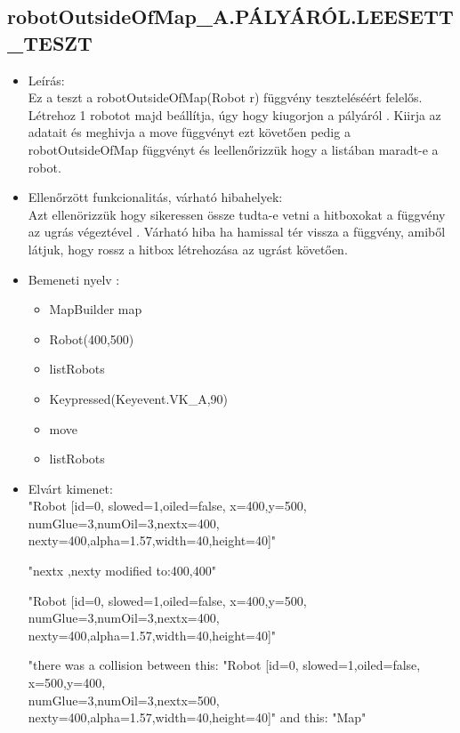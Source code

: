 \subsection{robotOutsideOfMap\_A.PÁLYÁRÓL.LEESETT\_TESZT}
\begin{itemize}
	\item Leírás: \\Ez a teszt a robotOutsideOfMap(Robot r) függvény teszteléséért felelős.
			Létrehoz 1 robotot majd beállítja, úgy hogy kiugorjon a pályáról .
			Kiirja az adatait  és meghivja a move függvényt ezt követően pedig a robotOutsideOfMap függvényt és leellenőrizzük hogy a listában maradt-e a robot.	\newline
	\item Ellenőrzött funkcionalitás, várható hibahelyek:\\
	Azt ellenörizzük hogy sikeressen össze tudta-e vetni a hitboxokat a függvény az ugrás végeztével .
	Várható hiba ha hamissal tér vissza a függvény, amiből látjuk, hogy rossz a hitbox létrehozása  az ugrást követően.
	\item Bemeneti nyelv :
		\begin{itemize}
\item MapBuilder map
		\item Robot(400,500)
		\item listRobots
		\item Keypressed(Keyevent.VK\_A,90)
		\item move
		\item listRobots
		\end{itemize}

	\item Elvárt kimenet: \\
		"Robot [id=0,  slowed=1,oiled=false, x=400,y=500, 
		\\numGlue=3,numOil=3,nextx=400,
		\\nexty=400,alpha=1.57,width=40,height=40]"\newline
		
		"nextx ,nexty modified to:400,400"\newline
	
		"Robot [id=0,  slowed=1,oiled=false, x=400,y=500, 
		\\numGlue=3,numOil=3,nextx=400,
		\\nexty=400,alpha=1.57,width=40,height=40]"\newline
		 
		 "there was a collision between this: "Robot [id=0,  slowed=1,oiled=false, x=500,y=400, 
		\\numGlue=3,numOil=3,nextx=500,
		\\nexty=400,alpha=1.57,width=40,height=40]"\newline
		and this:
		"Map"\newline
\end{itemize}

